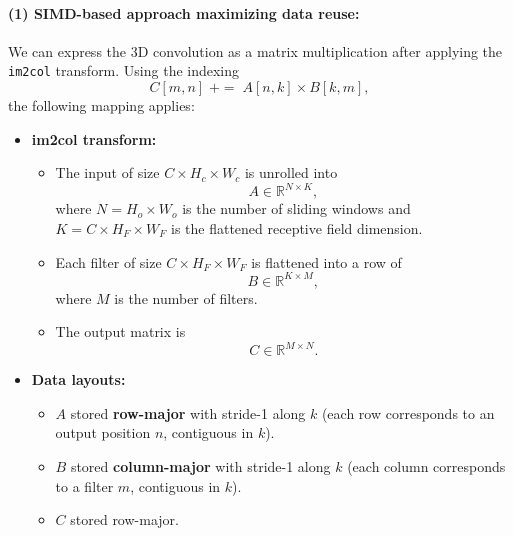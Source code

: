 \documentclass[a4 paper]{article}
\begin{document}

\paragraph{(1) SIMD-based approach maximizing data reuse:}
We can express the 3D convolution as a matrix multiplication after applying the \texttt{im2col} transform. Using the indexing
\[
C[m,n] \;+=\; A[n,k] \times B[k,m],
\]
the following mapping applies:

\begin{itemize}
  \item \textbf{im2col transform:}
  \begin{itemize}
    \item The input of size $C \times H_c \times W_c$ is unrolled into
    \[
      A \in \mathbb{R}^{N \times K},
    \]
    where $N = H_o \times W_o$ is the number of sliding windows and $K = C \times H_F \times W_F$ is the flattened receptive field dimension.
    \item Each filter of size $C \times H_F \times W_F$ is flattened into a row of
    \[
      B \in \mathbb{R}^{K \times M},
    \]
    where $M$ is the number of filters.
    \item The output matrix is
    \[
      C \in \mathbb{R}^{M \times N}.
    \]
  \end{itemize}

  \item \textbf{Data layouts:}
  \begin{itemize}
    \item $A$ stored \textbf{row-major} with stride-1 along $k$ (each row corresponds to an output position $n$, contiguous in $k$).
    \item $B$ stored \textbf{column-major} with stride-1 along $k$ (each column corresponds to a filter $m$, contiguous in $k$).
    \item $C$ stored row-major.
  \end{itemize}


\end{itemize}
\end{document}
